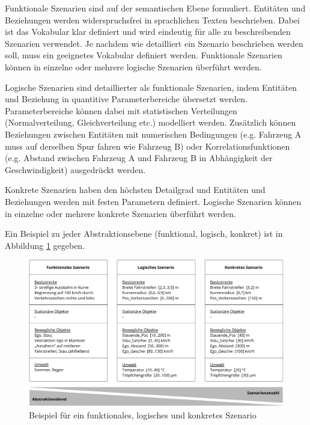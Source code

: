Funktionale Szenarien sind auf der semantischen Ebene formuliert. Entitäten und Beziehungen werden widerspruchsfrei in sprachlichen Texten beschrieben. Dabei ist das Vokabular klar definiert und wird eindeutig für alle zu beschreibenden Szenarien verwendet. Je nachdem wie detailliert ein Szenario beschrieben werden soll, muss ein geeignetes Vokabular definiert werden. Funktionale Szenarien können in einzelne oder mehrere logische Szenarien überführt werden.

Logische Szenarien sind detaillierter als funktionale Szenarien, indem  Entitäten und Beziehung in quantitive Parameterbereiche übersetzt werden. Parameterbereiche können dabei mit statistischen Verteilungen (Normalverteilung, Gleichverteilung etc.) modelliert werden. Zusätzlich können Beziehungen zwischen Entitäten mit numerischen Bedingungen (e.g. Fahrzeug A muss auf derselben Spur fahren wie Fahrzeug B) oder Korrelationsfunktionen (e.g. Abstand zwischen Fahrzeug A und Fahrzeug B in Abhängigkeit der Geschwindigkeit) ausgedrückt werden.

Konkrete Szenarien haben den höchsten Detailgrad und Entitäten und Beziehungen werden mit festen Parametern definiert. Logische Szenarien können in einzelne oder mehrere konkrete Szenarien überführt werden.

Ein Beispiel zu jeder Abstraktionsebene (funktional, logisch, konkret) ist in Abbildung \ref{fig_funktional_logisch_konrekt} gegeben.

\begin{figure}[h]
\centering
\includegraphics[scale=0.5]{images/funktional_logisch_konrekt.pdf}
\caption[Beispiel für ein funktionales, logisches und konkretes Szenario]{Beispiel für ein funktionales, logisches und konkretes Szenario \cite{bagschik2017szenarien}}
\label{fig_funktional_logisch_konrekt}
\end{figure}


